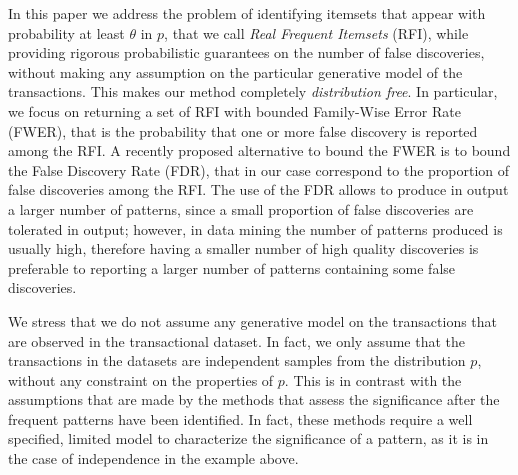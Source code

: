 In this paper we address the problem of
identifying itemsets that appear with probability at least $\theta$ in $p$,
that we call \emph{Real Frequent Itemsets} (RFI), while providing rigorous
probabilistic guarantees on the number of false discoveries, without making any
assumption on the particular generative model of the transactions. This makes
our method completely \emph{distribution free}. In particular, we focus on
returning a set of RFI with bounded Family-Wise Error Rate (FWER), that is the
probability that one or more false discovery is reported among the RFI. A
recently proposed alternative to  bound the FWER is to bound the False Discovery
Rate (FDR), that in our case correspond to the proportion of false discoveries
among the RFI. The use of the FDR allows to produce in output a larger number of
patterns, since a small proportion of false discoveries are tolerated in output;
however, in data mining the number of patterns produced is usually high,
therefore having a smaller number of high quality discoveries is preferable to
reporting a larger number of patterns containing some false discoveries.

We stress that we do not assume any generative model on the transactions that
are observed in the transactional dataset. In fact, we only assume that the
transactions in the datasets are independent samples from the distribution $p$,
without any constraint on the properties of $p$. This is in contrast with the
assumptions that are made by the methods that assess the significance after the
frequent patterns have been identified. In fact, these methods require a well
specified, limited model to characterize the significance of a pattern, as it is
in the case of independence in the example above.

\iffalse
{\bf XXX:} we should explain here what a statistical test is, what the FWER,
what the difference with the FDR, and so on. If we do it well here, we probably
do not need to do it again the preliminaries.

{\bf XXX:} We should really stress that we are not mining ``statistically
significant'' itemsets, as this would imply some kind of underlying model (e.g.,
``items appear independently in transactions'') that instead we do not have. I
believe we should actually somewhat comment on such models, which are clearly
too simplistic to be really useful/meaningful: in real/natural data generation
processes itemsets \emph{clearly} do not appear independently, so comparing the
dataset to such a model is only of limited value. 
\fi

